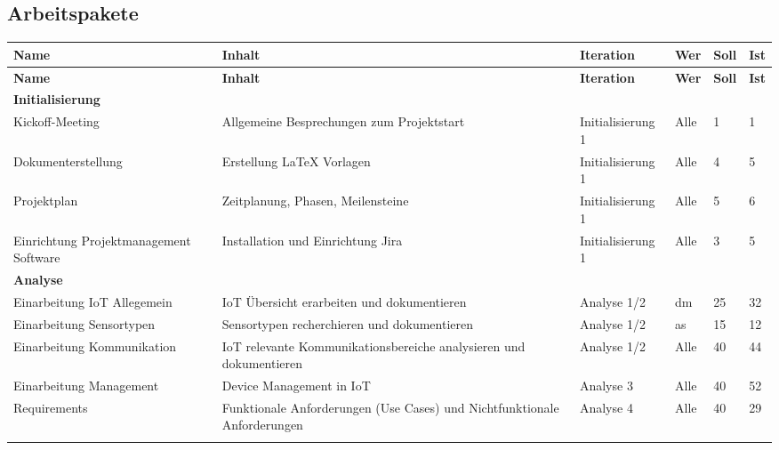 \begin{landscape}
\subsection{Arbeitspakete}
\begin{longtable}{ p{5.5cm} p{8cm} l l p{1cm} p{1cm} }

\hline 
\multicolumn{1}{p{5.5cm}}{\textbf{Name}} & \multicolumn{1}{p{8cm}}{\textbf{Inhalt}} & \multicolumn{1}{l}{\textbf{Iteration}} & \multicolumn{1}{l}{\textbf{Wer}} & \multicolumn{1}{p{1cm}}{\textbf{Soll}} & \multicolumn{1}{p{1cm}}{\textbf{Ist}} \\ \hline 
\endfirsthead

\hline 
\multicolumn{1}{p{5.5cm}}{\textbf{Name}} & \multicolumn{1}{p{8cm}}{\textbf{Inhalt}} & \multicolumn{1}{l}{\textbf{Iteration}} & \multicolumn{1}{l}{\textbf{Wer}} & \multicolumn{1}{p{1cm}}{\textbf{Soll}} & \multicolumn{1}{p{1cm}}{\textbf{Ist}} \\ \hline 
\endhead

\textbf{Initialisierung}&&&&\\ \addlinespace
Kickoff-Meeting & Allgemeine Besprechungen zum Projektstart & Initialisierung 1 & Alle & 1 & 1 \\ \addlinespace
Dokumenterstellung & Erstellung \LaTeX{} Vorlagen & Initialisierung 1 & Alle & 4 & 5 \\ \addlinespace
Projektplan & Zeitplanung, Phasen, Meilensteine & Initialisierung 1 & Alle & 5 & 6 \\ \addlinespace
Einrichtung Projektmanagement Software & Installation und Einrichtung Jira & Initialisierung 1 & Alle & 3 & 5 \\ \addlinespace

\textbf{Analyse}&&&&\\ \addlinespace
Einarbeitung IoT Allegemein & IoT Übersicht erarbeiten und dokumentieren & Analyse 1/2 & dm & 25 & 32\\ \addlinespace
Einarbeitung Sensortypen & Sensortypen recherchieren und dokumentieren & Analyse 1/2 & as & 15 & 12\\ \addlinespace
Einarbeitung Kommunikation & IoT relevante Kommunikationsbereiche analysieren und dokumentieren & Analyse 1/2 & Alle & 40 & 44\\ \addlinespace
Einarbeitung Management & Device Management in IoT & Analyse 3 & Alle & 40 & 52\\ \addlinespace
Requirements & Funktionale Anforderungen (Use Cases) und Nichtfunktionale Anforderungen & Analyse 4 & Alle & 40 & 29\\ \addlinespace



\end{longtable}
\end{landscape}
